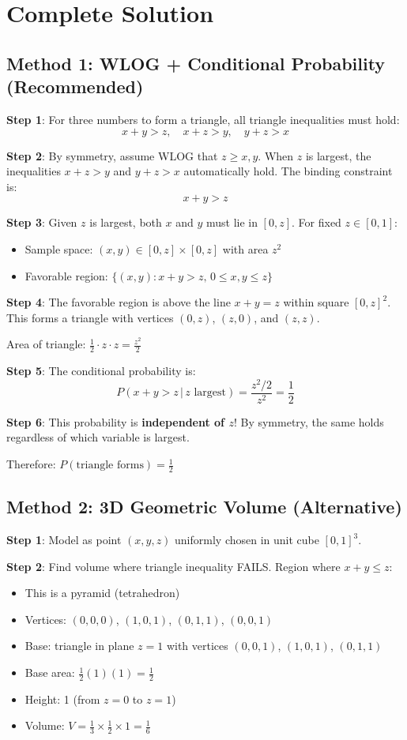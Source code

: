 \documentclass[11pt]{article}
\begin{document}
\section*{Complete Solution}

\subsection*{Method 1: WLOG + Conditional Probability (Recommended)}

\textbf{Step 1}: For three numbers to form a triangle, all triangle inequalities must hold:
\[x+y>z, \quad x+z>y, \quad y+z>x\]

\textbf{Step 2}: By symmetry, assume WLOG that $z \geq x,y$. When $z$ is largest, the inequalities $x+z>y$ and $y+z>x$ automatically hold. The binding constraint is:
\[x+y>z\]

\textbf{Step 3}: Given $z$ is largest, both $x$ and $y$ must lie in $[0,z]$. For fixed $z \in [0,1]$:
\begin{itemize}
    \item Sample space: $(x,y) \in [0,z] \times [0,z]$ with area $z^2$
    \item Favorable region: $\{(x,y) : x+y>z, \, 0 \leq x,y \leq z\}$
\end{itemize}

\textbf{Step 4}: The favorable region is above the line $x+y=z$ within square $[0,z]^2$. This forms a triangle with vertices $(0,z)$, $(z,0)$, and $(z,z)$.

Area of triangle: $\frac{1}{2} \cdot z \cdot z = \frac{z^2}{2}$

\textbf{Step 5}: The conditional probability is:
\[P(x+y>z \,|\, z \text{ largest}) = \frac{z^2/2}{z^2} = \frac{1}{2}\]

\textbf{Step 6}: This probability is \textbf{independent of $z$}! By symmetry, the same holds regardless of which variable is largest.

Therefore: $P(\text{triangle forms}) = \boxed{\frac{1}{2}}$

\subsection*{Method 2: 3D Geometric Volume (Alternative)}

\textbf{Step 1}: Model as point $(x,y,z)$ uniformly chosen in unit cube $[0,1]^3$.

\textbf{Step 2}: Find volume where triangle inequality FAILS. Region where $x+y \leq z$:
\begin{itemize}
    \item This is a pyramid (tetrahedron)
    \item Vertices: $(0,0,0)$, $(1,0,1)$, $(0,1,1)$, $(0,0,1)$
    \item Base: triangle in plane $z=1$ with vertices $(0,0,1)$, $(1,0,1)$, $(0,1,1)$
    \item Base area: $\frac{1}{2}(1)(1) = \frac{1}{2}$
    \item Height: 1 (from $z=0$ to $z=1$)
    \item Volume: $V = \frac{1}{3} \times \frac{1}{2} \times 1 = \frac{1}{6}$
\end{itemize}
\end{document}
